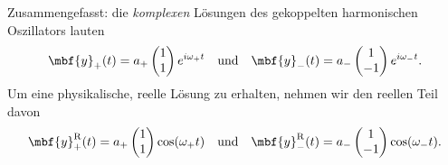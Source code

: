 \begin{beispiel}
    Zusammengefasst: die \emph{komplexen} Lösungen des gekoppelten harmonischen Oszillators lauten
    \begin{equation}
      \mbf{y}_{+}(t) = a_+\begin{pmatrix}
        1 \\ 1
      \end{pmatrix} e^{i\omega_+ t}\quad\text{und}\quad \mbf{y}_{-}(t) = a_-\begin{pmatrix}
        1 \\ -1
      \end{pmatrix} e^{i\omega_- t}.
    \end{equation}
    Um eine physikalische, reelle Lösung zu erhalten, nehmen wir den reellen Teil davon
    \begin{equation}
      \mbf{y}_{+}^{\text{R}}(t) = a_+\begin{pmatrix}
        1 \\ 1
      \end{pmatrix} \cos(\omega_+ t)\quad\text{und}\quad \mbf{y}_{-}^{\text{R}}(t) = a_-\begin{pmatrix}
        1 \\ -1
      \end{pmatrix} \cos(\omega_- t).
    \end{equation}
\end{beispiel}